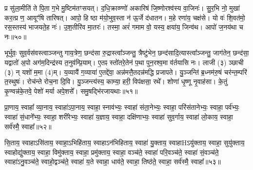 प्र सु॑ला॒मीति॑ ते पि॒ता ग॒भे मु॒ष्टिम॑तꣳसयत्। द॒धि॒क्राव्ण्णो॑ अकारिषं जि॒ष्णोरश्व॑स्य वा॒जिनः॑। सु॒र॒भि नो॒ मुखा॑ कर॒त्प्र ण॒ आयूꣳ॑षि तारिषत्। आपो॒ हि ष्ठा म॑यो॒भुव॒स्ता न॑ ऊ॒र्जे द॑धातन। म॒हे रणा॑य॒ चक्ष॑से। यो वः॑ शि॒वत॑मो॒ रस॒स्तस्य॑ भाजयते॒ह नः॑। उ॒श॒तीरि॑व मा॒तरः॑। तस्मा॒ अरं॑ गमाम वो॒ यस्य॒ क्षया॑य॒ जिन्व॑थ। आपो॑ ज॒नय॑था च नः॥५०॥

{\anuvakamend[{आ॒सा॒मत्ति॒ न रो॑हतो॒ जिन्व॑थ च॒त्वारि॑ च॥19॥}]}

भूर्भुवः॒ सुव॒र्वस॑वस्त्वाञ्जन्तु गाय॒त्रेण॒ छन्द॑सा रु॒द्रास्त्वा᳚ञ्जन्तु॒ त्रैष्टु॑भेन॒ छन्द॑सादि॒त्यास्त्वा᳚ञ्जन्तु॒ जाग॑तेन॒ छन्द॑सा॒ यद्वातो॑ अ॒पो अग॑म॒दिन्द्र॑स्य त॒नुव॑म्प्रि॒याम्। ए॒तꣴ स्तो॑तरे॒तेन॑ प॒था पुन॒रश्व॒मा व॑र्तयासि नः। लाजी (३) ञ्छाची (३) न् यशो॑ म॒मा (4)म्। य॒व्यायै॑ ग॒व्याया॑ ए॒तद्दे॑वा॒ अन्न॑मत्तै॒तदन्न॑मद्धि प्रजापते। यु॒ञ्जन्ति॑ ब्र॒ध्नम॑रु॒षं चर॑न्त॒म्परि॑ त॒स्थुषः॑। रोच॑न्ते रोच॒ना दि॒वि। यु॒ञ्जन्त्य॑स्य॒ काम्या॒ हरी॒ विप॑क्षसा॒ रथे᳚। शोणा॑ धृ॒ष्णू नृ॒वाह॑सा। के॒तुं कृ॒ण्वन्न॑के॒तवे॒ पेशो॑ मर्या अपे॒शसे᳚। समु॒षद्भि॑रजायथाः॥५१॥

{\anuvakamend[{ब्र॒ध्नं पञ्च॑विꣳशतिश्च॥20॥}]}

प्रा॒णाय॒ स्वाहा᳚ व्या॒नाय॒ स्वाहा॑\-ऽपा॒नाय॒ स्वाहा॒ स्नाव॑भ्यः॒ स्वाहा॑ संता॒नेभ्यः॒ स्वाहा॒ परि॑संतानेभ्यः॒ स्वाहा॒ पर्व॑भ्यः॒ स्वाहा॑ सं॒धाने᳚भ्यः॒ स्वाहा॒ शरी॑रेभ्यः॒ स्वाहा॑ य॒ज्ञाय॒ स्वाहा॒ दक्षि॑णाभ्यः॒ स्वाहा॑ सुव॒र्गाय॒ स्वाहा॑ लो॒काय॒ स्वाहा॒ सर्व॑स्मै॒ स्वाहा᳚॥५२॥

{\anuvakamend[{प्रा॒णाया॒ष्टाविꣳ॑शतिः॥21॥}]}

सि॒ताय॒ स्वाहा\-ऽसि॑ताय॒ स्वाहा॒\-ऽभिहि॑ताय॒ स्वाहा\-ऽन॑भिहिताय॒ स्वाहा॑ यु॒क्ताय॒ स्वाहाH\-ऽयु॑क्ताय॒ स्वाहा॒ सुयु॑क्ताय॒ स्वाहोद्यु॑क्ताय॒ स्वाहा॒ विमु॑क्ताय॒ स्वाहा॒ प्रमु॑क्ताय॒ स्वाहा॒ वञ्च॑ते॒ स्वाहा॑ परि॒वञ्च॑ते॒ स्वाहा॑ सं॒वञ्च॑ते॒ स्वाहा॑\-ऽनु॒वञ्च॑ते॒ स्वाहो॒द्वञ्च॑ते॒ स्वाहा॑ य॒ते स्वाहा॒ धाव॑ते॒ स्वाहा॒ तिष्ठ॑ते॒ स्वाहा॒ सर्व॑स्मै॒ स्वाहा᳚॥५३॥

{\anuvakamend[{सि॒ताया॒ष्टात्रिꣳ॑शत्॥22॥}]}


{}

